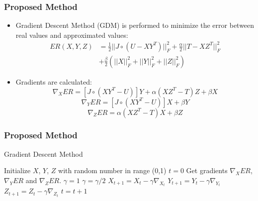 \documentclass[aspectratio=169,handout]{beamer}
\begin{document}
\begin{frame}
\frametitle{Proposed Method}
\begin{itemize}
\item Gradient Descent Method (GDM) is performed to minimize the error between real values and approximated values:
\begin{equation}
\label{eq:error}
\begin{aligned}
ER(X,Y,Z) &= \frac{1}{2}||J \circ (U-XY^T)||^{2}_{F}+\frac{\alpha}{2}||T-XZ^T||^{2}_{F}\\
&+\frac{\beta}{2}\left( ||X||^{2}_{F} + ||Y||^{2}_{F} + ||Z||^{2}_{F} \right)
\end{aligned}
\end{equation}
\pause
\item Gradients are calculated:
\begin{equation}
\label{eq:gradientx}
\nabla_XER = \left[ J \circ (XY^T-U) \right] Y + \alpha (XZ^T-T)Z + \beta X
\end{equation}
\begin{equation}
\label{eq:gradienty}
\nabla_YER = \left[ J \circ (XY^T-U) \right] X + \beta Y
\end{equation}
\begin{equation}
\label{eq:gradientz}
\nabla_ZER = \alpha (XZ^T-T)X + \beta Z
\end{equation}
\end{itemize}
\end{frame}

\begin{frame}
\frametitle{Proposed Method}
\begin{algorithm}[H]
\caption{Gradient Descent Method}
\label{alg:gdm}
\begin{algorithmic}[1]
\STATE Initialize $X$, $Y$, $Z$ with random number in range (0,1)
\STATE $t = 0$
\STATE Get gradients $\nabla_XER$, $\nabla_YER$ and $\nabla_ZER$.
\STATE $\gamma=1$
\STATE $\gamma = \gamma/2$
\ENDWHILE
\STATE $X_{t+1} = X_{t}-\gamma\nabla_{X_t}$
\STATE $Y_{t+1} = Y_{t}-\gamma\nabla_{Y_t}$
\STATE $Z_{t+1} = Z_{t}-\gamma\nabla_{Z_t}$
\STATE $t = t+1$
\ENDWHILE
\end{algorithmic}
\end{algorithm}
\end{frame}
\end{document}
